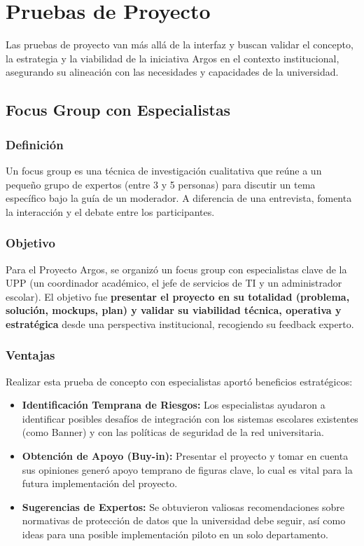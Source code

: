\section{Pruebas de Proyecto}

Las pruebas de proyecto van más allá de la interfaz y buscan validar el concepto, la estrategia y la viabilidad de la iniciativa Argos en el contexto institucional, asegurando su alineación con las necesidades y capacidades de la universidad.

\subsection{Focus Group con Especialistas}

\subsubsection{Definición}
Un focus group es una técnica de investigación cualitativa que reúne a un pequeño grupo de expertos (entre 3 y 5 personas) para discutir un tema específico bajo la guía de un moderador. A diferencia de una entrevista, fomenta la interacción y el debate entre los participantes.

\subsubsection{Objetivo}
Para el Proyecto Argos, se organizó un focus group con especialistas clave de la UPP (un coordinador académico, el jefe de servicios de TI y un administrador escolar). El objetivo fue \textbf{presentar el proyecto en su totalidad (problema, solución, mockups, plan) y validar su viabilidad técnica, operativa y estratégica} desde una perspectiva institucional, recogiendo su feedback experto.

\subsubsection{Ventajas}
Realizar esta prueba de concepto con especialistas aportó beneficios estratégicos:
\begin{itemize}
	\item \textbf{Identificación Temprana de Riesgos:} Los especialistas ayudaron a identificar posibles desafíos de integración con los sistemas escolares existentes (como Banner) y con las políticas de seguridad de la red universitaria.
	\item \textbf{Obtención de Apoyo (Buy-in):} Presentar el proyecto y tomar en cuenta sus opiniones generó apoyo temprano de figuras clave, lo cual es vital para la futura implementación del proyecto.
	\item \textbf{Sugerencias de Expertos:} Se obtuvieron valiosas recomendaciones sobre normativas de protección de datos que la universidad debe seguir, así como ideas para una posible implementación piloto en un solo departamento.
\end{itemize}

